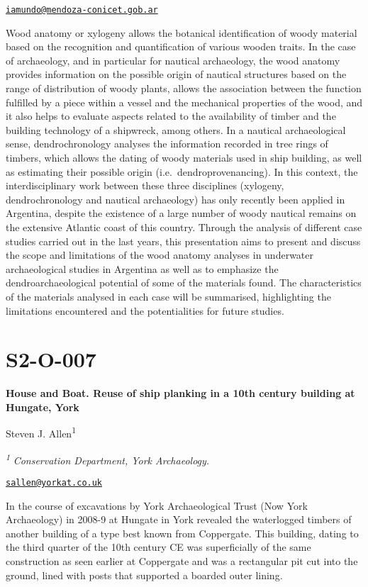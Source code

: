 \documentclass[
]{book}
\begin{document}
\href{mailto:iamundo@mendoza-conicet.gob.ar}{\nolinkurl{iamundo@mendoza-conicet.gob.ar}}

Wood anatomy or xylogeny allows the botanical identification of woody material based on the recognition and quantification of various wooden traits. In the case of archaeology, and in particular for nautical archaeology, the wood anatomy provides information on the possible origin of nautical structures based on the range of distribution of woody plants, allows the association between the function fulfilled by a piece within a vessel and the mechanical properties of the wood, and it also helps to evaluate aspects related to the availability of timber and the building technology of a shipwreck, among others. In a nautical archaeological sense, dendrochronology analyses the information recorded in tree rings of timbers, which allows the dating of woody materials used in ship building, as well as estimating their possible origin (i.e.~dendroprovenancing). In this context, the interdisciplinary work between these three disciplines (xylogeny, dendrochronology and nautical archaeology) has only recently been applied in Argentina, despite the existence of a large number of woody nautical remains on the extensive Atlantic coast of this country. Through the analysis of different case studies carried out in the last years, this presentation aims to present and discuss the scope and limitations of the wood anatomy analyses in underwater archaeological studies in Argentina as well as to emphasize the dendroarchaeological potential of some of the materials found. The characteristics of the materials analysed in each case will be summarised, highlighting the limitations encountered and the potentialities for future studies.

\hypertarget{s2-o-007}{%
\section*{S2-O-007}\label{s2-o-007}}

\textbf{House and Boat. Reuse of ship planking in a 10th century building at Hungate, York}

Steven J. Allen\textsuperscript{1}

\textsuperscript{\emph{1}} \emph{Conservation Department, York Archaeology.}

\href{mailto:sallen@yorkat.co.uk}{\nolinkurl{sallen@yorkat.co.uk}}

In the course of excavations by York Archaeological Trust (Now York Archaeology) in 2008-9 at Hungate in York revealed the waterlogged timbers of another building of a type best known from Coppergate. This building, dating to the third quarter of the 10th century CE was superficially of the same construction as seen earlier at Coppergate and was a rectangular pit cut into the ground, lined with posts that supported a boarded outer lining.
\end{document}
